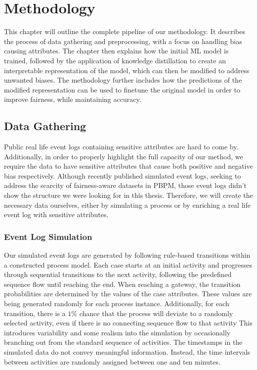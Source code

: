 \chapter{Methodology}
\label{sec:methodology}
This chapter will outline the complete pipeline of our methodology.
It describes the process of data gathering and preprocessing,
with a focus on handling bias causing attributes.
The chapter then explains how the initial ML model is trained,
followed by the application of knowledge distillation to create an interpretable
representation of the model, which can then be modified to address unwanted biases.
The methodology further includes how the predictions of the modified representation
can be used to finetune the original model in order to improve fairness, while maintaining accuracy.

\section{Data Gathering}
Public real life event logs
containing sensitive attributes are hard to come by.
Additionally, in order to properly highlight the full capacity of our method,
we require the data to have sensitive attributes
that cause both positive and negative bias respectively.
Although \cite{simulated_logs} recently published simulated event logs,
seeking to address the scarcity of fairness-aware datasets in PBPM,
those event logs didn't show the structure we were looking for in this thesis.
Therefore, we will create the necessary data ourselves,
either by simulating a process or by enriching a real life event log with sensitive attributes.

\subsection{Event Log Simulation}
Our simulated event logs are generated by following rule-based transitions within a constructed process model.
Each case starts at an initial activity and progresses through sequential transitions to the next activity,
following the predefined sequence flow until reaching the end.
When reaching a gateway, the transition probabilities are determined by the values of the case attributes.
These values are being generated randomly for each process instance.
Additionally, for each transition, there is a $1\%$ chance that the process will deviate to a randomly selected activity,
even if there is no connecting sequence flow to that activity
This introduces variability and some realism into the simulation by occasionally branching out from the standard sequence of activities.
The timestamps in the simulated data do not convey meaningful information.
Instead, the time intervals between activities are randomly assigned between one and ten minutes.

